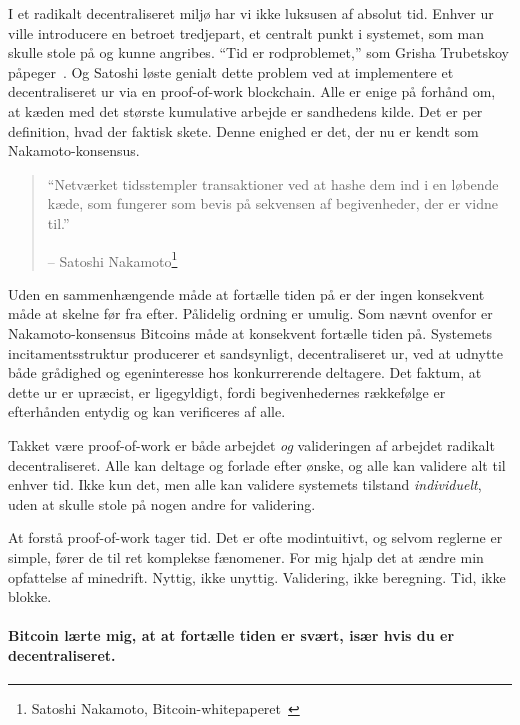 I et radikalt decentraliseret miljø har vi ikke luksusen af absolut tid. 
Enhver ur ville introducere en betroet tredjepart, et centralt punkt i 
systemet, som man skulle stole på og kunne angribes. \enquote{Tid er 
rodproblemet,} som Grisha Trubetskoy påpeger~\cite{pow-clock}. Og Satoshi 
løste genialt dette problem ved at implementere et decentraliseret ur via 
en proof-of-work blockchain. Alle er enige på forhånd om, at kæden med det 
største kumulative arbejde er sandhedens kilde. Det er per definition, hvad 
der faktisk skete. Denne enighed er det, der nu er kendt som Nakamoto-konsensus.

\begin{quotation}\begin{samepage}
  \enquote{Netværket tidsstempler transaktioner ved at hashe dem ind i en 
  løbende kæde, som fungerer som bevis på sekvensen af begivenheder, der er 
  vidne til.}
  \begin{flushright} -- Satoshi Nakamoto\footnote{Satoshi Nakamoto, 
    Bitcoin-whitepaperet~\cite{whitepaper}}
\end{flushright}\end{samepage}\end{quotation}
  
Uden en sammenhængende måde at fortælle tiden på er der ingen konsekvent måde at
skelne før fra efter. Pålidelig ordning er umulig. Som nævnt
ovenfor er Nakamoto-konsensus Bitcoins måde at konsekvent fortælle tiden på. 
Systemets incitamentsstruktur producerer et sandsynligt,
decentraliseret ur, ved at udnytte både grådighed og egeninteresse hos
konkurrerende deltagere. Det faktum, at dette ur er upræcist, er
ligegyldigt, fordi begivenhedernes rækkefølge er efterhånden entydig og kan
verificeres af alle.

Takket være proof-of-work er både arbejdet \textit{og} valideringen af arbejdet
radikalt decentraliseret. Alle kan deltage og forlade efter ønske, og
alle kan validere alt til enhver tid. Ikke kun det, men
alle kan validere systemets tilstand \textit{individuelt}, uden
at skulle stole på nogen andre for validering.

At forstå proof-of-work tager tid. Det er ofte modintuitivt,
og selvom reglerne er simple, fører de til ret komplekse fænomener.
For mig hjalp det at ændre min opfattelse af minedrift. Nyttig, ikke unyttig.
Validering, ikke beregning. Tid, ikke blokke.

\paragraph{Bitcoin lærte mig, at at fortælle tiden er svært, især hvis du er
decentraliseret.}

